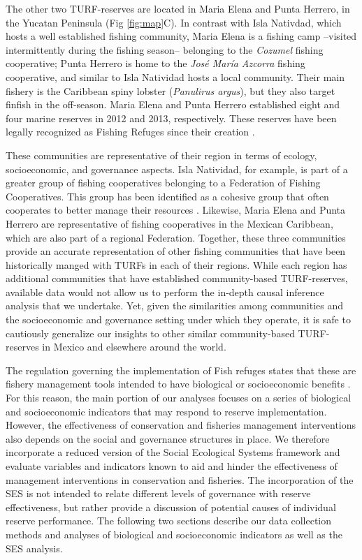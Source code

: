 \documentclass{frontiersSCNS}
\begin{document}
The other two TURF-reserves are located in Maria Elena and Punta
Herrero, in the Yucatan Peninsula (Fig \ref{fig:map}C). In contrast with
Isla Nativdad, which hosts a well established fishing community, Maria
Elena is a fishing camp --visited intermittently during the fishing
season-- belonging to the \emph{Cozumel} fishing cooperative; Punta
Herrero is home to the \emph{José María Azcorra} fishing cooperative,
and similar to Isla Natividad hosts a local community. Their main
fishery is the Caribbean spiny lobster (\emph{Panulirus argus}), but
they also target finfish in the off-season. Maria Elena and Punta
Herrero established eight and four marine reserves in 2012 and 2013,
respectively. These reserves have been legally recognized as Fishing
Refuges since their creation \citep{dof_website_2012,dof_website_2013}.

These communities are representative of their region in terms of
ecology, socioeconomic, and governance aspects. Isla Natividad, for
example, is part of a greater group of fishing cooperatives belonging to
a Federation of Fishing Cooperatives. This group has been identified as
a cohesive group that often cooperates to better manage their resources
\citep{mccay_2014,mccay_2017,acevesbueno_2017}. Likewise, Maria Elena
and Punta Herrero are representative of fishing cooperatives in the
Mexican Caribbean, which are also part of a regional Federation.
Together, these three communities provide an accurate representation of
other fishing communities that have been historically manged with TURFs
in each of their regions. While each region has additional communities
that have established community-based TURF-reserves, available data
would not allow us to perform the in-depth causal inference analysis
that we undertake. Yet, given the similarities among communities and the
socioeconomic and governance setting under which they operate, it is
safe to cautiously generalize our insights to other similar
community-based TURF-reserves in Mexico and elsewhere around the world.

The regulation governing the implementation of Fish refuges states that
these are fishery management tools intended to have biological or
socioeconomic benefits \citep{nom}. For this reason, the main portion of
our analyses focuses on a series of biological and socioeconomic
indicators that may respond to reserve implementation. However, the
effectiveness of conservation and fisheries management interventions
also depends on the social and governance structures in place. We
therefore incorporate a reduced version of the Social Ecological Systems
framework \citep{ostrom_2009} and evaluate variables and indicators
known to aid and hinder the effectiveness of management interventions in
conservation and fisheries. The incorporation of the SES is not intended
to relate different levels of governance with reserve effectiveness, but
rather provide a discussion of potential causes of individual reserve
performance. The following two sections describe our data collection
methods and analyses of biological and socioeconomic indicators as well
as the SES analysis.
\end{document}
